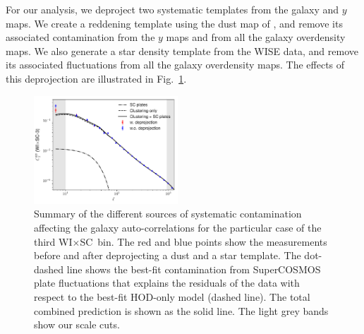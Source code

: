 \documentclass[useAMS,usenatbib]{mn2e}
\newcommand{\wisc}{WI$\times$SC}
\begin{document}
      For our analysis, we deproject two systematic templates from the galaxy and $y$ maps. We create a reddening template using the dust map of \cite{1998ApJ...500..525S}, and remove its associated contamination from the $y$ maps and from all the galaxy overdensity maps. We also generate a star density template from the WISE data, and remove its associated fluctuations from all the galaxy overdensity maps. The effects of this deprojection are illustrated in Fig.\!~\ref{fig:clsyst}.

      \begin{figure}
        \centering
        \includegraphics[width=0.48\textwidth]{cl_syst_summary.pdf}
        \caption{Summary of the different sources of systematic contamination affecting the galaxy auto-correlations for the particular case of the third \wisc~bin. The red and blue points show the measurements before and after deprojecting a dust and a star template. The dot-dashed line shows the best-fit contamination from SuperCOSMOS plate fluctuations that explains the residuals of the data with respect to the best-fit HOD-only model (dashed line). The total combined prediction is shown as the solid line. The light grey bands show our scale cuts.}
        \label{fig:clsyst}
      \end{figure}
\end{document}
